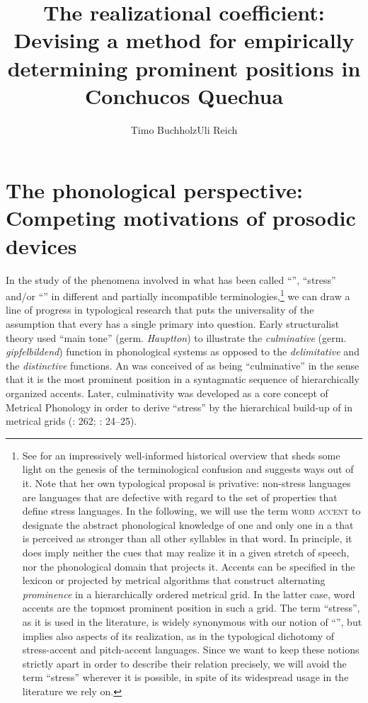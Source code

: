 \documentclass[output=paper]{LSP/langsci}
\author{Timo Buchholz\affiliation{Freie Universität Berlin}\lastand Uli Reich\affiliation{Freie Universität Berlin}}
\title{The realizational coefficient: Devising a method for empirically determining prominent positions in Conchucos Quechua}
\begin{document}
\label{chap:buc}\label{ch:4}

\section{The phonological perspective: Competing motivations of prosodic devices}
In the study of the phenomena involved in what has been called ``'', ``stress'' and\slash or ``'' in different and partially incompatible terminologies,\footnote{See \citet{Beckman1986} for an impressively well-informed historical overview that sheds some light on the genesis of the terminological confusion and suggests ways out of it. Note that her own typological proposal is privative: non-stress languages are languages that are defective with regard to the set of properties that define stress languages. In the following, we will use the term \textsc{word accent} to designate the abstract phonological knowledge of one and only one  in a  that is perceived as stronger than all other syllables in that word. In principle, it does imply neither the  cues that may realize it in a given stretch of speech, nor the phonological domain that projects it. Accents can be specified in the lexicon or projected by metrical algorithms that construct alternating \textit{prominence} in a hierarchically ordered metrical grid. In the latter case, word accents are the topmost prominent position in such a grid. The term ``stress'', as it is used in the literature, is widely synonymous with our notion of ``'', but implies also aspects of its realization, as in the typological dichotomy of {stress-accent} and {pitch-accent} languages. Since we want to keep these notions strictly apart in order to describe their relation precisely, we will avoid the term ``stress'' wherever it is possible, in spite of its widespread usage in the literature we rely on.} we can draw a line of progress in typological research that puts the universality of the assumption that every  has a single primary  into question. Early structuralist theory \citep{Trubeckoj1939} used ``main tone'' (germ. \textit{Hauptton}) to illustrate the \textit{culminative} (germ. \textit{gipfelbildend}) function in phonological systems as opposed to the \textit{delimitative} and the \textit{distinctive} functions. An  was conceived of as being ``culminative'' in the sense that it is the most prominent position in a syntagmatic sequence of hierarchically organized accents. Later, culminativity was developed as a core concept of Metrical Phonology in order to derive ``stress'' by the hierarchical build-up of  in metrical grids (\citealt{Liberman1977}: 262; \citealt{Hayes1995}: 24–25). 
\end{document}
